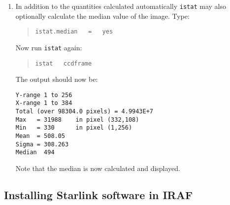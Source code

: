 \documentclass[twoside,11pt]{article}
\begin{document}
\begin{enumerate}
   The output should be something like:

  \newpage
  \begin{verbatim}
        image = ""              (IMage) Name of image to examine
       ystart =                 *! (YStart) First Y value to be used
         yend =                 *! (YEnd) Last Y value to be used
       xstart =                 *! (XStart) First X value to be used
         xend =                 *! (XEnd) Last X value to be used
       (pass2 = no)             (PAss2) Pass twice through data for better sigm
      (median = no)             (MEDian) Calculate median as well as other stat
  (stat_total = 0.)             
    (stat_max = 0.)             
    (stat_min = 0.)             
   (stat_mean = 0.)             
  (stat_sigma = 0.)             
   (stat_size = 0.)             
   (stat_xmax = 0.)             
   (stat_xmin = 0.)             
   (stat_ymax = 0.)             
   (stat_ymin = 0.)             
 (stat_xstart = 0.)             
   (stat_xend = 0.)             
 (stat_ystart = 0.)             
   (stat_yend = 0.)             
 (stat_median = 0.)             
        (mode = "ql")           
  \end{verbatim}

  \item In addition to the quantities calculated automatically {\tt istat}
   may also optionally calculate the median value of the image.  Type:

  \begin{quote}
   {\tt istat.median ~ = ~ yes}
  \end{quote}

   Now run {\tt istat} again:

  \begin{quote}
   {\tt istat ~ ccdframe}
  \end{quote}

   The output should now be:

  \begin{verbatim}
Y-range 1 to 256
X-range 1 to 384
Total (over 98304.0 pixels) = 4.9943E+7
Max   = 31988    in pixel (332,108)
Min   = 330      in pixel (1,256)
Mean  = 508.05
Sigma = 308.263
Median  494
  \end{verbatim}

   Note that the median is now calculated and displayed.

\end{enumerate}

\subsection{\label{STARINSTALL}Installing Starlink software in IRAF}
\end{document}
